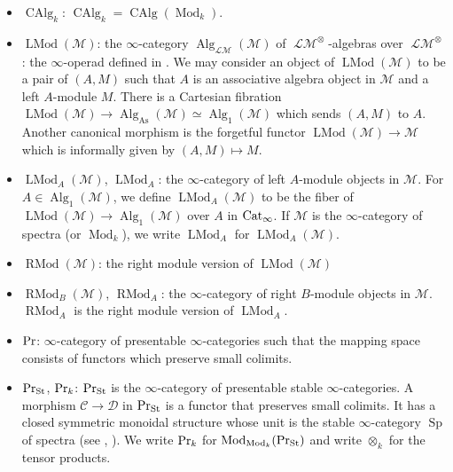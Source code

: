 \documentclass[leqno,12pt]{amsart}
\theoremstyle{plain}
\theoremstyle{definition}
\newcommand{\DDD}{\mathcal{D}}
\newcommand{\CCC}{\mathcal{C}}
\newcommand{\PR}{\textup{Pr}}
\newcommand{\MMM}{\mathcal{M}}
\newcommand{\SP}{\operatorname{Sp}}
\newcommand{\Mod}{\operatorname{Mod}}
\newcommand{\Cat}{\textup{Cat}_{\infty}}
\newcommand{\Alg}{\operatorname{Alg}}
\newcommand{\CAlg}{\operatorname{CAlg}}
\newcommand{\LM}{\operatorname{\mathcal{LM}}}
\newcommand{\PRST}{\PR_{\textup{St}}}
\newcommand{\assoc}{\operatorname{As}}
\newcommand{\LMod}{\operatorname{LMod}}
\newcommand{\RMod}{\operatorname{RMod}}
\begin{document}
\begin{itemize}
\item $\CAlg_k$: $\CAlg_k=\CAlg(\Mod_k)$.


\item 
$\LMod(\MMM)$:
the $\infty$-category $\Alg_{\LM}(\MMM)$ of $\LM^\otimes$-algebras
over $\LM^\otimes$: the $\infty$-operad defined in \cite[4.2.1.7]{HA}.
We may consider an object of  $\LMod(\MMM)$ to be a pair 
of $(A,M)$ such that $A$ is an associative algebra object in $\MMM$
and a left $A$-module $M$.
There is a Cartesian fibration $\LMod(\MMM)\to \Alg_{\assoc}(\MMM)\simeq \Alg_1(\MMM)$
which sends $(A,M)$ to $A$.
Another canonical morphism is the forgetful functor $\LMod(\MMM)\to \MMM$
which is informally given by $(A,M)\mapsto M$.


\item $\LMod_A(\MMM)$, $\LMod_A$: the $\infty$-category of left $A$-module objects in $\MMM$.
For $A\in \Alg_1(\MMM)$, we define $\LMod_A(\MMM)$
to be the fiber of $\LMod(\MMM)\to \Alg_1(\MMM)$ over $A$ in $\Cat$.
If $\MMM$ is the $\infty$-category of spectra (or $\Mod_k$),
we write $\LMod_A$ for $\LMod_A(\MMM)$.



\item $\RMod(\MMM)$: the right module version of $\LMod(\MMM)$

\item $\RMod_B(\MMM)$, $\RMod_A$: the $\infty$-category of right $B$-module objects in $\MMM$.
$\RMod_A$ is the right module version of $\LMod_A$.

\item $\PR$: $\infty$-category of presentable $\infty$-categories such that the mapping space consists of functors which preserve small colimits. 

\item $\PRST$, $\PR_k$: $\PRST$ is the $\infty$-category of presentable stable $\infty$-categories. A morphism $\CCC\to \DDD$ in $\PRST$ is a functor that preserves small colimits. It has a closed symmetric monoidal structure whose unit is the stable $\infty$-category $\SP$ of spectra  (see \cite[Definition 5.5.3.1]{HTT}, \cite[4.8]{HA}).
We write $\PR_k$ for $\Mod_{\Mod_k}(\PRST)$ and write $\otimes_k$ for the tensor products.



\end{itemize}
\end{document}
